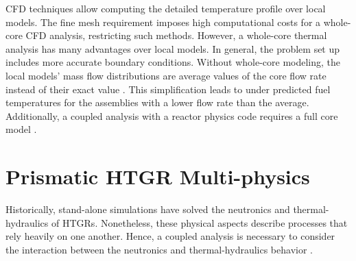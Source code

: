 CFD techniques allow computing the detailed temperature profile over local models.
The fine mesh requirement imposes high computational costs for a whole-core CFD analysis, restricting such methods.
However, a whole-core thermal analysis has many advantages over local models.
In general, the problem set up includes more accurate boundary conditions.
Without whole-core modeling, the local models' mass flow distributions are average values of the core flow rate instead of their exact value \cite{huning_novel_2016}.
This simplification leads to under predicted fuel temperatures for the assemblies with a lower flow rate than the average.
Additionally, a coupled analysis with a reactor physics code requires a full core model \cite{tak_practical_2012}.


\section{Prismatic HTGR Multi-physics}

Historically, stand-alone simulations have solved the neutronics and thermal-hydraulics of \glspl{HTGR}.
Nonetheless, these physical aspects describe processes that rely heavily on one another.
Hence, a coupled analysis is necessary to consider the interaction between the neutronics and thermal-hydraulics behavior \cite{tak_cappgamma_2016}.


